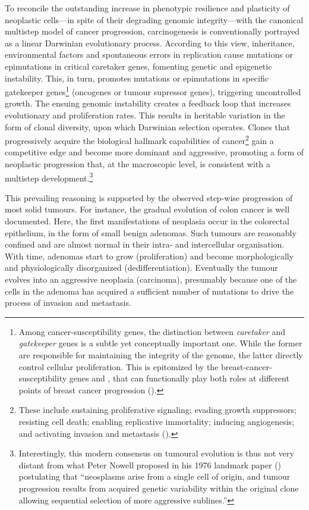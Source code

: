 To reconcile the outstanding increase in phenotypic resilience and plasticity of
neoplastic cells---in spite of their degrading genomic integrity---with the
canonical multistep model of cancer
progression,\cite{land_cellular_1983,vogelstein_multistep_1993} carcinogenesis
is conventionally portrayed as a linear Darwinian evolutionary
process.\cite{merlo_cancer_2006,polyak_tumor_2014} According to this
view,\cite{podlaha_evolution_2012} inheritance, environmental factors and
spontaneous errors in  replication cause mutations or
epimutations in critical caretaker genes, fomenting genetic and epigenetic
instability.  This, in turn, promotes mutations or epimutations in specific
gatekeeper genes\footnote{Among \mbox{cancer-susceptibility} genes, the
  distinction between \emph{caretaker} and \emph{gatekeeper} genes is a subtle
  yet conceptually important one.  While the former are responsible for
  maintaining the integrity of the genome, the latter directly control cellular
  proliferation.  This is epitomized by the \mbox{breast-cancer-susceptibility}
  genes  and , that can
  functionally play both roles at different points of breast cancer progression
  (\citealp{kinzler_gatekeepers_1997}).}  (oncogenes or tumour supressor genes),
triggering uncontrolled growth.  The ensuing genomic instability creates a
feedback loop that increases evolutionary and proliferation
rates.\cite{sieber_genomic_2003} This results in heritable variation in the form
of clonal diversity, upon which Darwinian selection operates.  Clones that
progressively acquire the biological hallmark capabilities of
cancer\footnote{These include sustaining proliferative signaling; evading growth
  suppressors; resisting cell death; enabling replicative immortality; inducing
  angiogenesis; and activating invasion and metastasis
  (\citealp{hanahan_hallmarks_2011}).} gain a competitive edge and become more
dominant and aggressive, promoting a form of neoplastic progression that, at the
macroscopic level, is consistent with a multistep
development.\footnote{Interestingly, this modern consensus on tumoural evolution
  is thus not very distant from what Peter Nowell proposed in his 1976 landmark
  paper (\citealp{nowell_clonal_1976}) postulating that ``neosplasms arise from
  a single cell of origin, and tumour progression results from acquired genetic
  variability within the original clone allowing sequential selection of more
  aggressive sublines.''}

This prevailing reasoning is supported by the observed \mbox{step-wise}
progression of most solid tumours.  For instance, the gradual evolution of colon
cancer is well documented.\cite{vogelstein_multistep_1993} Here, the first
manifestations of neoplasia occur in the colorectal epithelium, in the form of
small benign adenomas.  Such tumours are reasonably confined and are almost
normal in their intra- and intercellular organisation.  With time, adenomas
start to grow (proliferation) and become morphologically and physiologically
disorganized (dedifferentiation).  Eventually the tumour evolves into an
aggressive neoplasia (carcinoma), presumably because one of the cells in the
adenoma has acquired a sufficient number of mutations to drive the process of
invasion and metastasis.

